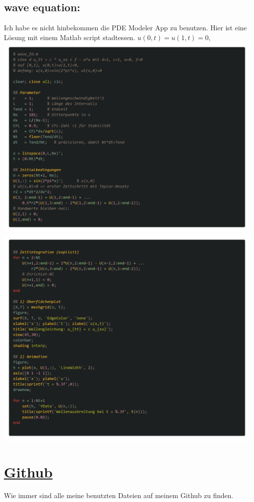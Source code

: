 \documentclass{scrartcl}
\begin{document}
\subsection{wave equation:}
Ich habe es nicht hinbekommen die PDE Modeler App zu benutzen.
Hier ist eine Lösung mit einem Matlab script stadtessen.
$u(0,t)=u(1,t)=0,$\\
\includegraphics[scale=0.2]{WaveCode1.png}\\
\includegraphics[scale=0.2]{WaveCode2.png}\\



\section*{\href{https://github.com/7hands/Angewandte-Modellierung-25-Colmant}{Github}}
Wie immer sind alle meine benutzten Dateien auf meinem Github zu finden.
\end{document}
